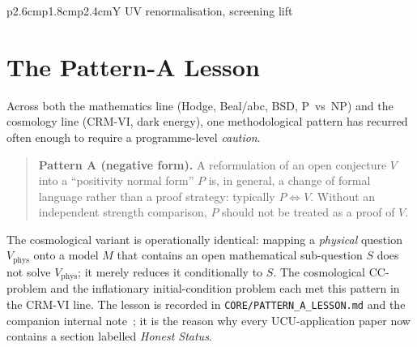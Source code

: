 \documentclass[11pt,a4paper]{article}
\theoremstyle{remark}
\begin{document}
\begin{table}[h]
\begin{tabularx}{\textwidth}{p{2.6cm}p{1.8cm}p{2.4cm}Y}
UV renormalisation, screening lift \\
\bottomrule
\end{tabularx}
\endgroup
\caption{Honest proof status of FST building blocks in the
mathematics, physics and cosmology lines, as of 2026-05. Every entry
references an individual project whose primary proof note (BEWEISNOTIZ.md)
documents the precise lemma chain and the residual open gaps. The
present overview neither proves new instances of these results nor
strengthens their mathematical content; it locates each within the
same UCU/RG/MEPP architecture. Where the status reads ``reformulation''
(P vs NP) or ``framework'' (Hodge, BSD, NS, FST-DE), the open core
gap is the original Millennium-class difficulty -- consistent with
the Pattern-A lesson (Section~\ref{sec:pattern-a}).}
\label{tab:building-blocks}
\end{table}

\section{The Pattern-A Lesson}
\label{sec:pattern-a}

Across both the mathematics line (Hodge, Beal/abc, BSD, P~vs~NP) and
the cosmology line (CRM-VI, dark energy), one methodological pattern
has recurred often enough to require a programme-level
\emph{caution}.

\begin{quote}
\textbf{Pattern A (negative form).}
A reformulation of an open conjecture $V$ into a ``positivity
normal form'' $P$ is, in general, a change of formal language rather
than a proof strategy: typically $P \Leftrightarrow V$. Without an
independent strength comparison, $P$ should not be treated as a proof
of $V$.
\end{quote}

\noindent The cosmological variant is operationally identical:
mapping a \emph{physical} question $V_{\text{phys}}$ onto a model
$M$ that contains an open mathematical sub-question $S$ does not
solve $V_{\text{phys}}$; it merely reduces it conditionally to $S$.
The cosmological CC-problem and the inflationary initial-condition
problem each met this pattern in the CRM-VI line. The lesson is
recorded in \texttt{CORE/PATTERN\_A\_LESSON.md} and the companion
internal note~\cite{FST-Unified2026}; it is the reason
why every UCU-application paper now contains a section labelled
\emph{Honest Status}.
\end{document}
